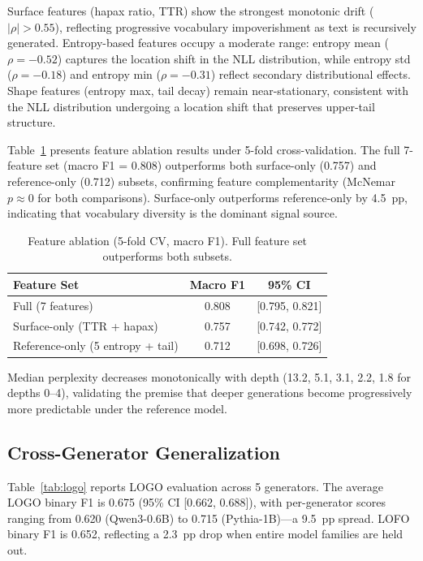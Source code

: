 \documentclass[11pt,a4paper]{article}
\begin{document}
Surface features (hapax ratio, TTR) show the strongest monotonic drift ($|\rho| > 0.55$), reflecting progressive vocabulary impoverishment as text is recursively generated.
Entropy-based features occupy a moderate range: entropy mean ($\rho = {-}0.52$) captures the location shift in the NLL distribution, while entropy std ($\rho = {-}0.18$) and entropy min ($\rho = {-}0.31$) reflect secondary distributional effects.
Shape features (entropy max, tail decay) remain near-stationary, consistent with the NLL distribution undergoing a location shift that preserves upper-tail structure.

Table~\ref{tab:ablation} presents feature ablation results under 5-fold cross-validation.
The full 7-feature set (macro F1 = 0.808) outperforms both surface-only (0.757) and reference-only (0.712) subsets, confirming feature complementarity (McNemar $p \approx 0$ for both comparisons).
Surface-only outperforms reference-only by 4.5~pp, indicating that vocabulary diversity is the dominant signal source.

\begin{table}[t]
\centering
\small
\caption{Feature ablation (5-fold CV, macro F1). Full feature set outperforms both subsets.}
\label{tab:ablation}
\begin{tabular}{lcc}
\toprule
\textbf{Feature Set} & \textbf{Macro F1} & \textbf{95\% CI} \\
\midrule
Full (7 features) & 0.808 & {[0.795, 0.821]} \\
Surface-only (TTR + hapax) & 0.757 & {[0.742, 0.772]} \\
Reference-only (5 entropy + tail) & 0.712 & {[0.698, 0.726]} \\
\bottomrule
\end{tabular}
\end{table}

Median perplexity decreases monotonically with depth (13.2, 5.1, 3.1, 2.2, 1.8 for depths 0--4), validating the premise that deeper generations become progressively more predictable under the reference model.

\subsection{Cross-Generator Generalization}
\label{sec:cross_gen}

Table~\ref{tab:logo} reports LOGO evaluation across 5 generators.
The average LOGO binary F1 is 0.675 (95\% CI [0.662, 0.688]), with per-generator scores ranging from 0.620 (Qwen3-0.6B) to 0.715 (Pythia-1B)---a 9.5~pp spread.
LOFO binary F1 is 0.652, reflecting a 2.3~pp drop when entire model families are held out.
\end{document}
